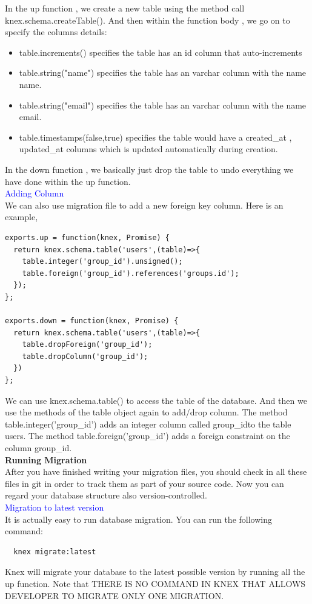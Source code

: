 \documentclass[a4paper]{article}
\begin{document}
In the up function , we create a new table using the method call knex.schema.createTable(). And then within the function body , we go on to specify the columns details:
\begin{itemize}
\item table.increments() specifies the table has an id column that auto-increments
\item table.string("name") specifies the table has an varchar column with the name name.
\item table.string("email") specifies the table has an varchar column with the name email.
\item table.timestamps(false,true) specifies the table would have a created\_at , updated\_at columns which is updated automatically during creation.
\end{itemize}
In the down function , we basically just drop the table to undo everything we have done within the up function.\\

\textcolor{blue}{Adding Column}\\

We can also use migration file to add a new foreign key column. Here is an example,
\begin{lstlisting}
exports.up = function(knex, Promise) {
  return knex.schema.table('users',(table)=>{
    table.integer('group_id').unsigned();
    table.foreign('group_id').references('groups.id');
  });
};

exports.down = function(knex, Promise) {
  return knex.schema.table('users',(table)=>{
    table.dropForeign('group_id');
    table.dropColumn('group_id');
  })
};
\end{lstlisting}
We can use knex.schema.table() to access the table of the database. And then we use the methods of the table object again to add/drop column. The method table.integer('group\_id') adds an integer column called group\_idto the table users. The method table.foreign('group\_id') adds a foreign constraint on the column group\_id.\\

\textbf{Running Migration}\\
After you have finished writing your migration files, you should check in all these files in git in order to track them as part of your source code. Now you can regard your database structure also version-controlled.\\

\textcolor{blue}{Migration to latest version}\\
It is actually easy to run database migration. You can run the following command:
\begin{lstlisting}
  knex migrate:latest
\end{lstlisting}
Knex will migrate your database to the latest possible version by running all the up function. Note that THERE IS NO COMMAND IN KNEX THAT ALLOWS DEVELOPER TO MIGRATE ONLY ONE MIGRATION.\\
\end{document}
